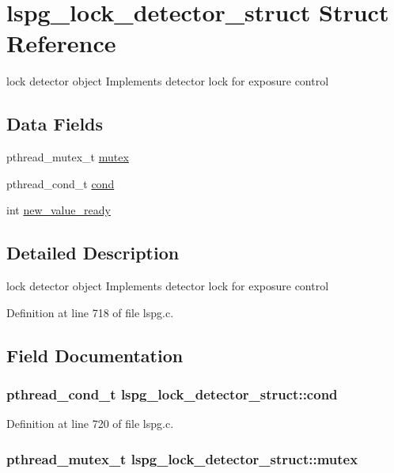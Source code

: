 \hypertarget{structlspg__lock__detector__struct}{
\section{lspg\_\-lock\_\-detector\_\-struct Struct Reference}
\label{structlspg__lock__detector__struct}
}


lock detector object Implements detector lock for exposure control  
\subsection*{Data Fields}
\begin{DoxyCompactItemize}
\item 
pthread\_\-mutex\_\-t \hyperlink{structlspg__lock__detector__struct_ab5ab5534b376a8fbafdd0b54cec4483c}{mutex}
\item 
pthread\_\-cond\_\-t \hyperlink{structlspg__lock__detector__struct_adc90c859665dccc8717219e824cba0b8}{cond}
\item 
int \hyperlink{structlspg__lock__detector__struct_a62373414b815fe178edd8522b3bd4d78}{new\_\-value\_\-ready}
\end{DoxyCompactItemize}


\subsection{Detailed Description}
lock detector object Implements detector lock for exposure control 

Definition at line 718 of file lspg.c.

\subsection{Field Documentation}
\hypertarget{structlspg__lock__detector__struct_adc90c859665dccc8717219e824cba0b8}{
\subsubsection[{cond}]{\setlength{\rightskip}{0pt plus 5cm}pthread\_\-cond\_\-t {\bf lspg\_\-lock\_\-detector\_\-struct::cond}}}
\label{structlspg__lock__detector__struct_adc90c859665dccc8717219e824cba0b8}


Definition at line 720 of file lspg.c.\hypertarget{structlspg__lock__detector__struct_ab5ab5534b376a8fbafdd0b54cec4483c}{
\subsubsection[{mutex}]{\setlength{\rightskip}{0pt plus 5cm}pthread\_\-mutex\_\-t {\bf lspg\_\-lock\_\-detector\_\-struct::mutex}}}
\label{structlspg__lock__detector__struct_ab5ab5534b376a8fbafdd0b54cec4483c}


